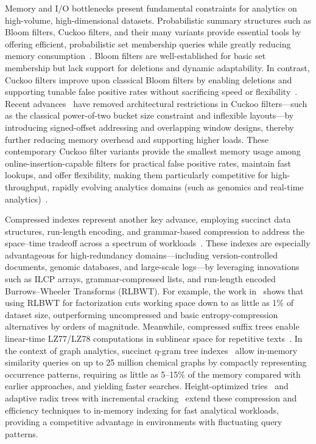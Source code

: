 \documentclass[sigconf]{acmart}
\begin{document}
Memory and I/O bottlenecks present fundamental constraints for analytics on high-volume, high-dimensional datasets. Probabilistic summary structures such as Bloom filters, Cuckoo filters, and their many variants provide essential tools by offering efficient, probabilistic set membership queries while greatly reducing memory consumption~\cite{ref80,ref81,ref82,ref87,ref106,ref108,ref109,ref118}. Bloom filters are well-established for basic set membership but lack support for deletions and dynamic adaptability. In contrast, Cuckoo filters improve upon classical Bloom filters by enabling deletions and supporting tunable false positive rates without sacrificing speed or flexibility~\cite{ref81,ref82}. Recent advances~\cite{ref87} have removed architectural restrictions in Cuckoo filters—such as the classical power-of-two bucket size constraint and inflexible layouts—by introducing signed-offset addressing and overlapping window designs, thereby further reducing memory overhead and supporting higher loads. These contemporary Cuckoo filter variants provide the smallest memory usage among online-insertion-capable filters for practical false positive rates, maintain fast lookups, and offer flexibility, making them particularly competitive for high-throughput, rapidly evolving analytics domains (such as genomics and real-time analytics)~\cite{ref87}. 

Compressed indexes represent another key advance, employing succinct data structures, run-length encoding, and grammar-based compression to address the space--time tradeoff across a spectrum of workloads~\cite{ref80,ref81,ref87,ref106,ref108,ref118}. These indexes are especially advantageous for high-redundancy domains—including version-controlled documents, genomic databases, and large-scale logs—by leveraging innovations such as ILCP arrays, grammar-compressed lists, and run-length encoded Burrows--Wheeler Transforms (RLBWT). For example, the work in~\cite{ref80} shows that using RLBWT for factorization cuts working space down to as little as 1\% of dataset size, outperforming uncompressed and basic entropy-compression alternatives by orders of magnitude. Meanwhile, compressed suffix trees enable linear-time LZ77/LZ78 computations in sublinear space for repetitive texts~\cite{ref81}. In the context of graph analytics, succinct q-gram tree indexes~\cite{ref106} allow in-memory similarity queries on up to 25 million chemical graphs by compactly representing occurrence patterns, requiring as little as 5--15\% of the memory compared with earlier approaches, and yielding faster searches. Height-optimized tries~\cite{ref108} and adaptive radix trees with incremental cracking~\cite{ref109} extend these compression and efficiency techniques to in-memory indexing for fast analytical workloads, providing a competitive advantage in environments with fluctuating query patterns.
\end{document}
